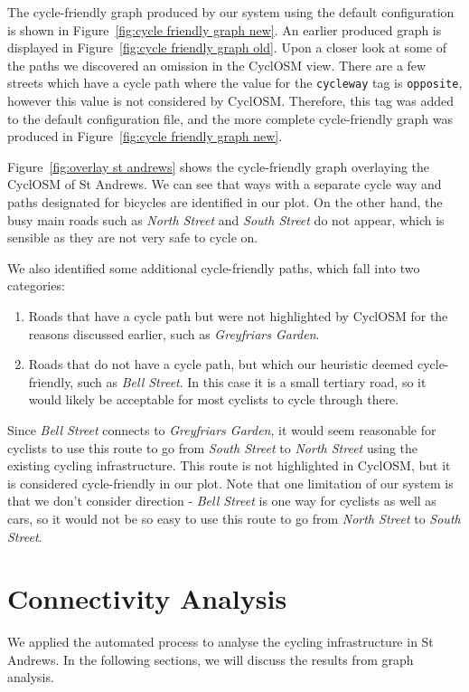 \documentclass[12pt,a4paper]{report}
\begin{document}
The cycle-friendly graph produced by our system using the default configuration is shown in Figure~\ref{fig:cycle friendly graph new}. An earlier produced graph is displayed in Figure~\ref{fig:cycle friendly graph old}. Upon a closer look at some of the paths we discovered an omission in the CyclOSM view. There are a few streets which have a cycle path where the value for the \texttt{cycleway} tag is \texttt{opposite}, however this value is not considered by CyclOSM. Therefore, this tag was added to the default configuration file, and the more complete cycle-friendly graph was produced in Figure~\ref{fig:cycle friendly graph new}.

Figure~\ref{fig:overlay st andrews} shows the cycle-friendly graph overlaying the CyclOSM of St Andrews. We can see that ways with a separate cycle way and paths designated for bicycles are identified in our plot. On the other hand, the busy main roads such as \textit{North Street} and \textit{South Street} do not appear, which is sensible as they are not very safe to cycle on. 

We also identified some additional cycle-friendly paths, which fall into two categories: \begin{enumerate}
    \item Roads that have a cycle path but were not highlighted by CyclOSM for the reasons discussed earlier, such as \textit{Greyfriars Garden}.
    \item Roads that do not have a cycle path, but which our heuristic deemed cycle-friendly, such as \textit{Bell Street}. In this case it is a small tertiary road, so it would likely be acceptable for most cyclists to cycle through there.
\end{enumerate}

Since \textit{Bell Street} connects to \textit{Greyfriars Garden}, it would seem reasonable for cyclists to use this route to go from \textit{South Street} to \textit{North Street} using the existing cycling infrastructure. This route is not highlighted in CyclOSM, but it is considered cycle-friendly in our plot. Note that one limitation of our system is that we don't consider direction - \textit{Bell Street} is one way for cyclists as well as cars, so it would not be so easy to use this route to go from \textit{North Street} to \textit{South Street}.

\section{Connectivity Analysis}\label{sec:connectivity}
We applied the automated process to analyse the cycling infrastructure in St Andrews. In the following sections, we will discuss the results from graph analysis.
\end{document}
